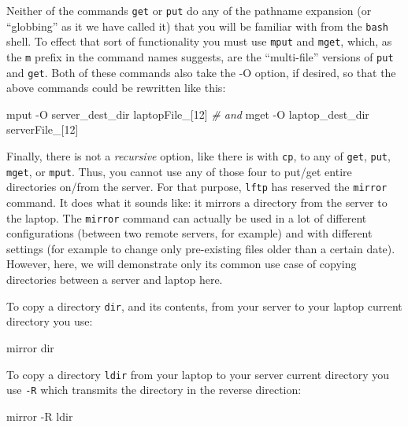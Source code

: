 \documentclass[]{krantz}
\makeatletter
\newenvironment{Shaded}{\begin{snugshade}}{\end{snugshade}}
\newcommand{\CommentTok}[1]{\textcolor[rgb]{0.37,0.37,0.37}{\textit{#1}}}
\newcommand{\ExtensionTok}[1]{#1}
\newcommand{\NormalTok}[1]{#1}
\newenvironment{kframe}{%
\medskip{}
\setlength{\fboxsep}{.8em}
 \def\at@end@of@kframe{}%
 \ifinner\ifhmode%
  \def\at@end@of@kframe{\end{minipage}}%
  \begin{minipage}{\columnwidth}%
 \fi\fi%
 \def\FrameCommand##1{\hskip\@totalleftmargin \hskip-\fboxsep
 \colorbox{shadecolor}{##1}\hskip-\fboxsep
     \hskip-\linewidth \hskip-\@totalleftmargin \hskip\columnwidth}%
 \MakeFramed {\advance\hsize-\width
   \@totalleftmargin\z@ \linewidth\hsize
   \@setminipage}}%
 {\par\unskip\endMakeFramed%
 \at@end@of@kframe}
\renewenvironment{Shaded}{\begin{kframe}}{\end{kframe}}
\makeatother
\begin{document}
Neither of the commands \texttt{get} or \texttt{put} do any of the pathname expansion (or ``globbing'' as it
we have called it) that you will be familiar with from the \texttt{bash} shell. To effect that sort
of functionality you must use \texttt{mput} and \texttt{mget}, which, as the \texttt{m} prefix in the
command names suggests, are the ``multi-file'' versions of \texttt{put} and \texttt{get}. Both of these
commands also take the -O option, if desired, so that the above commands could be
rewritten like this:

\begin{Shaded}
\begin{Highlighting}[]
\ExtensionTok{mput}\NormalTok{ -O server_dest_dir laptopFile_[12]}
\CommentTok{# and}
\ExtensionTok{mget}\NormalTok{ -O laptop_dest_dir serverFile_[12]}
\end{Highlighting}
\end{Shaded}

Finally, there is not a \emph{recursive} option, like there is with \texttt{cp}, to any of \texttt{get}, \texttt{put}, \texttt{mget},
or \texttt{mput}. Thus, you cannot use any of those four to put/get entire directories on/from the
server. For that purpose, \texttt{lftp} has reserved the \texttt{mirror} command. It does what it sounds like:
it mirrors a directory from the server to the laptop. The \texttt{mirror} command can actually
be used in a lot of different configurations (between two remote servers, for example) and
with different settings (for example to change only pre-existing files older than
a certain date).
However, here, we will demonstrate only its common use case
of copying directories between a server and laptop here.

To copy a directory \texttt{dir}, and its contents, from your server to your
laptop current directory you use:

\begin{Shaded}
\begin{Highlighting}[]
\ExtensionTok{mirror}\NormalTok{ dir}
\end{Highlighting}
\end{Shaded}

To copy a directory \texttt{ldir} from your laptop to your server current directory you
use \texttt{-R} which transmits the directory in the reverse direction:

\begin{Shaded}
\begin{Highlighting}[]
\ExtensionTok{mirror}\NormalTok{ -R ldir}
\end{Highlighting}
\end{Shaded}
\end{document}
